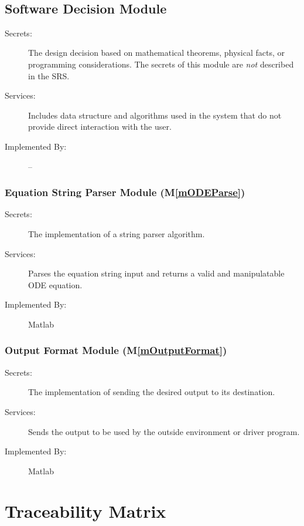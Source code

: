 \documentclass[12pt, titlepage]{article}
\newcommand{\mref}[1]{M\ref{#1}}
\begin{document}
~\newpage

\subsection{Software Decision Module}

\begin{description}
\item[Secrets:] The design decision based on mathematical theorems, physical
  facts, or programming considerations. The secrets of this module are
  \emph{not} described in the SRS.
\item[Services:] Includes data structure and algorithms used in the system that
  do not provide direct interaction with the user. 
\item[Implemented By:] --
\end{description}

\subsubsection{Equation String Parser Module (\mref{mODEParse})}

\begin{description}
\item[Secrets:]The implementation of a string parser algorithm.
\item[Services:]Parses the equation string input and returns a valid and manipulatable ODE equation.
\item[Implemented By:] Matlab
\end{description}

\subsubsection{Output Format Module (\mref{mOutputFormat})}

\begin{description}
\item[Secrets:]The implementation of sending the desired output to its destination.
\item[Services:]Sends the output to be used by the outside environment or driver program.
\item[Implemented By:] Matlab
\end{description}

\section{Traceability Matrix} \label{SecTM}
\end{document}
